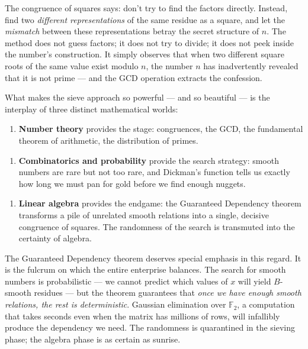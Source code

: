 The congruence of squares says: don't try to find the factors directly. Instead, find two \textit{different representations} of the same residue as a square, and let the \textit{mismatch} between these representations betray the secret structure of $n$. The method does not guess factors; it does not try to divide; it does not peek inside the number's construction. It simply observes that when two different square roots of the same value exist modulo $n$, the number $n$ has inadvertently revealed that it is not prime --- and the GCD operation extracts the confession.

What makes the sieve approach so powerful --- and so beautiful --- is the interplay of three distinct mathematical worlds:

\begin{enumerate}[leftmargin=*]
\item \textbf{Number theory} provides the stage: congruences, the GCD, the fundamental theorem of arithmetic, the distribution of primes.
\end{enumerate}

\begin{enumerate}[leftmargin=*]
\item \textbf{Combinatorics and probability} provide the search strategy: smooth numbers are rare but not too rare, and Dickman's function tells us exactly how long we must pan for gold before we find enough nuggets.
\end{enumerate}

\begin{enumerate}[leftmargin=*]
\item \textbf{Linear algebra} provides the endgame: the Guaranteed Dependency theorem transforms a pile of unrelated smooth relations into a single, decisive congruence of squares. The randomness of the search is transmuted into the certainty of algebra.
\end{enumerate}

The Guaranteed Dependency theorem deserves special emphasis in this regard. It is the fulcrum on which the entire enterprise balances. The search for smooth numbers is probabilistic --- we cannot predict which values of $x$ will yield $B$-smooth residues --- but the theorem guarantees that \textit{once we have enough smooth relations, the rest is deterministic}. Gaussian elimination over $\mathbb{F}_2$, a computation that takes seconds even when the matrix has millions of rows, will infallibly produce the dependency we need. The randomness is quarantined in the sieving phase; the algebra phase is as certain as sunrise.


